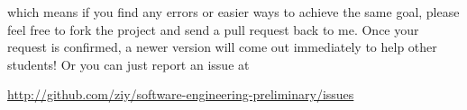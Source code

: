 \documentclass[oneside]{memoir}
\begin{document}
\begin{titlingpage}
\begin{minipage}{1.2\textwidth}
\begin{enumerate}
which means if you find any errors or easier ways to achieve the same goal,
please feel free to fork the project and send a pull request back to me. Once
your request is confirmed, a newer version will come out immediately to help
other students! Or you can just report an issue at

\url{http://github.com/ziy/software-engineering-preliminary/issues}

\end{enumerate}

\end{minipage}
\hspace{-0.1\textwidth}
\end{titlingpage}






\end{document}
